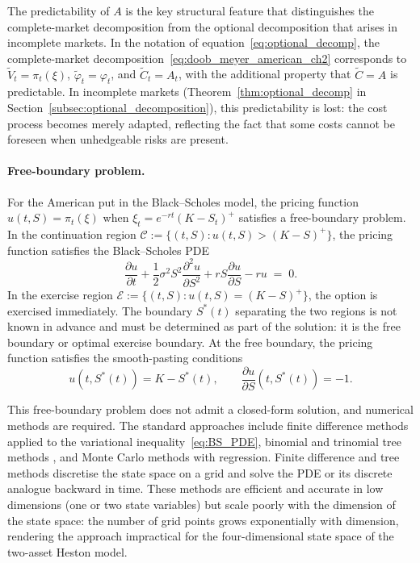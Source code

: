 The predictability of $A$ is the key structural feature that distinguishes
the complete-market decomposition from the optional decomposition that
arises in incomplete markets.  In the notation of
equation~\eqref{eq:optional_decomp}, the complete-market
decomposition~\eqref{eq:doob_meyer_american_ch2} corresponds to
$\tilde{V}_t = \pi_t(\xi)$, $\tilde{\varphi}_t = \varphi_t$, and
$\tilde{C}_t = A_t$, with the additional property that $\tilde{C} = A$
is predictable.  In incomplete markets
(Theorem~\ref{thm:optional_decomp} in
Section~\ref{subsec:optional_decomposition}), this predictability is
lost: the cost process becomes merely adapted, reflecting the fact that
some costs cannot be foreseen when unhedgeable risks are present.

\paragraph{Free-boundary problem.}
For the American put in the Black--Scholes model, the pricing function
$u(t, S) = \pi_t(\xi)$ when $\xi_t = e^{-rt}(K - S_t)^+$ satisfies a
free-boundary problem.  In the continuation region
$\mathcal{C} := \{(t,S) : u(t,S) > (K-S)^+\}$, the pricing function
satisfies the Black--Scholes PDE
\begin{equation}
\label{eq:BS_PDE}
\frac{\partial u}{\partial t}
+ \frac{1}{2}\sigma^2 S^2
  \frac{\partial^2 u}{\partial S^2}
+ r S \frac{\partial u}{\partial S}
- r u \;=\; 0.
\end{equation}
In the exercise region
$\mathcal{E} := \{(t,S) : u(t,S) = (K-S)^+\}$, the option is exercised
immediately.  The boundary $S^*(t)$ separating the two regions is not
known in advance and must be determined as part of the solution: it is
the free boundary or optimal exercise boundary.  At the
free boundary, the pricing function satisfies the smooth-pasting
conditions
\begin{equation}
\label{eq:smooth_pasting}
u(t, S^*(t)) = K - S^*(t),
\qquad
\frac{\partial u}{\partial S}(t, S^*(t)) = -1.
\end{equation}

This free-boundary problem does not admit a closed-form solution, and
numerical methods are required.  The standard approaches include finite
difference methods applied to the variational
inequality~\eqref{eq:BS_PDE}, binomial and trinomial tree methods
\citep{CoxRossRubinstein1979}, and Monte Carlo methods with regression.
Finite difference and tree methods discretise the state space on a grid
and solve the PDE or its discrete analogue backward in time.  These
methods are efficient and accurate in low dimensions (one or two state
variables) but scale poorly with the dimension of the state space: the
number of grid points grows exponentially with dimension, rendering the
approach impractical for the four-dimensional state space of the two-asset
Heston model.

